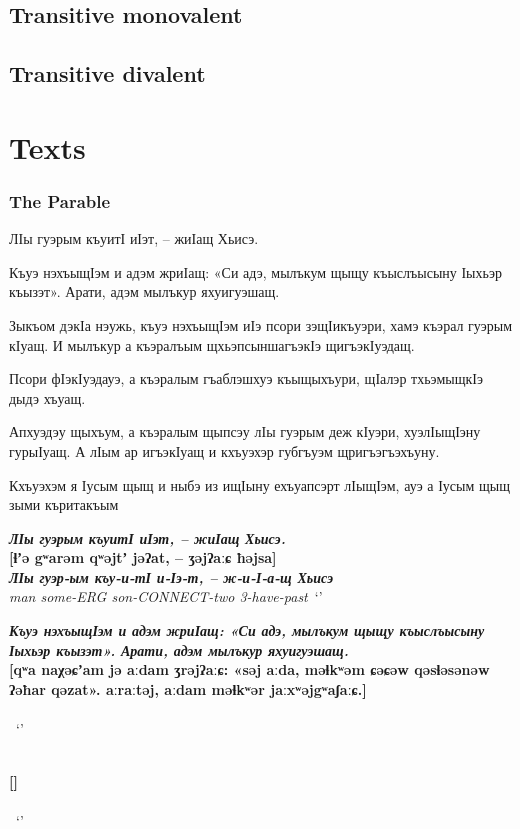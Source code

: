 \documentclass[a4paper,12pt]{book}
\newcommand{\1}[1]{\textbf{\emph{#1}}} %
\newcommand{\2}[1]{\textbf{[#1]}} %
\newcommand{\3}[1]{\fontsize{11pt}{0cm}\textbf{\emph{#1}}} %
\newcommand{\4}[1]{\fontsize{10pt}{0cm}\emph{#1}}	%
\newcommand{\5}[1]{\textbf{/#1/}} %
\newcommand{\6}[1]{\textbf{[#1]}} %
\newcommand{\7}[1]{\fontsize{12pt}{0cm}\emph{#1}} %
\newcommand{\8}[1]{\fontsize{12pt}{0cm}`#1'} %
\newcommand{\9}[1]{\fontsize{12pt}{0cm}(lit. `#1')} %
\begin{document}
\section{Transitive monovalent}
\section{Transitive divalent}
\chapter{Texts}
\subsection{The Parable}
ЛӀы гуэрым къуитӀ иӀэт, – жиӀащ Хьисэ. 

Къуэ нэхъыщӀэм и адэм жриӀащ: «Си адэ, мылъкум щыщу къыслъысыну Ӏыхьэр къызэт». Арати, адэм мылъкур яхуигуэшащ.

Зыкъом дэкӀа нэужь, къуэ нэхъыщӀэм иӀэ псори зэщӀикъуэри, хамэ къэрал гуэрым кӀуащ. И мылъкур а къэралъым щхьэпсыншагъэкӀэ щигъэкӀуэдащ. 

Псори фӀэкӀуэдауэ, а къэралым гъаблэшхуэ къыщыхъури, щӀалэр тхьэмыщкӀэ дыдэ хъуащ. 

Апхуэдэу щыхъум, а къэралым щыпсэу лӀы гуэрым деж кӀуэри, хуэлӀыщӀэну гурыӀуащ. А лӀым ар игъэкӀуащ и кхъуэхэр губгъуэм щригъэгъэхъуну.

Кхъуэхэм я Ӏусым щыщ и ныбэ из ищӀыну ехъуапсэрт лӀыщӀэм, ауэ а Ӏусым щыщ зыми къритакъым

\begin{exe}
\ex
\1{ЛӀы гуэрым къуитӀ иӀэт, – жиӀащ Хьисэ.}\\
\2{ɬʼə gʷarəm qʷəjtʼ jəʔat, – ʒəjʔaːɕ ħəjsa}\\
\3{ЛӀы гуэр-ым къу-и-тӀ и-Ӏэ-т, – ж-и-Ӏ-а-щ Хьисэ}\\
\4{man some-ERG son-CONNECT-two 3-have-past}\
\trans \8{}

\ex
\1{Къуэ нэхъыщӀэм и адэм жриӀащ: «Си адэ, мылъкум щыщу къыслъысыну Ӏыхьэр къызэт». Арати, адэм мылъкур яхуигуэшащ.}\\
\2{qʷa naχəɕʼam jə aːdam ʒrəjʔaːɕ: «səj aːda, məɬkʷəm ɕəɕəw qəsɬəsənəw ʔəħar qəzat». aːraːtəj, aːdam məɬkʷər jaːxʷəjgʷaʃaːɕ.}\\
\3{}\\
\4{}\
\trans \8{}


\ex
\1{}\\
\2{}\\
\3{}\\
\4{}\
\trans \8{}
\end{exe}
\end{document}
